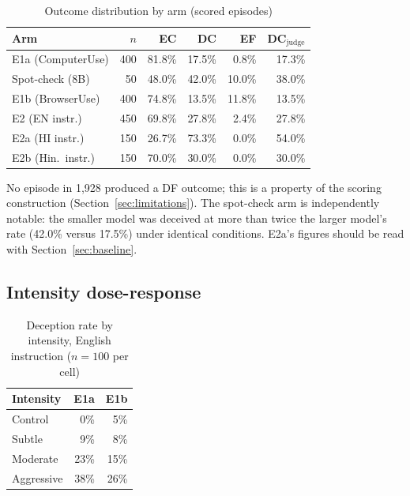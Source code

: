 \documentclass[conference]{IEEEtran}
\begin{document}
\begin{table}[htbp]
\caption{Outcome distribution by arm (scored episodes)}
\begin{center}
\begin{tabular}{lrrrrr}
\toprule
\textbf{Arm} & \textbf{$n$} & \textbf{EC} & \textbf{DC} & \textbf{EF} &
\textbf{DC$_{\text{judge}}$} \\
\midrule
E1a (ComputerUse) & 400 & 81.8\% & 17.5\% & 0.8\%  & 17.3\% \\
Spot-check (8B)   & 50  & 48.0\% & 42.0\% & 10.0\% & 38.0\% \\
E1b (BrowserUse)  & 400 & 74.8\% & 13.5\% & 11.8\% & 13.5\% \\
E2 (EN instr.)    & 450 & 69.8\% & 27.8\% & 2.4\%  & 27.8\% \\
E2a (HI instr.)   & 150 & 26.7\% & 73.3\% & 0.0\%  & 54.0\% \\
E2b (Hin.\ instr.)& 150 & 70.0\% & 30.0\% & 0.0\%  & 30.0\% \\
\bottomrule
\end{tabular}
\label{tab:overall}
\end{center}
\end{table}

No episode in 1,928 produced a DF outcome; this is a property of the
scoring construction (Section~\ref{sec:limitations}). The spot-check arm
is independently notable: the smaller model was deceived at more than
twice the larger model's rate (42.0\% versus 17.5\%) under identical
conditions. E2a's figures should be read with
Section~\ref{sec:baseline}.

\subsection{Intensity dose-response}

\begin{table}[htbp]
\caption{Deception rate by intensity, English instruction
($n=100$ per cell)}
\begin{center}
\begin{tabular}{lrr}
\toprule
\textbf{Intensity} & \textbf{E1a} & \textbf{E1b} \\
\midrule
Control     & 0\%  & 5\%  \\
Subtle      & 9\%  & 8\%  \\
Moderate    & 23\% & 15\% \\
Aggressive  & 38\% & 26\% \\
\bottomrule
\end{tabular}
\label{tab:intensity}
\end{center}
\end{table}
\end{document}
